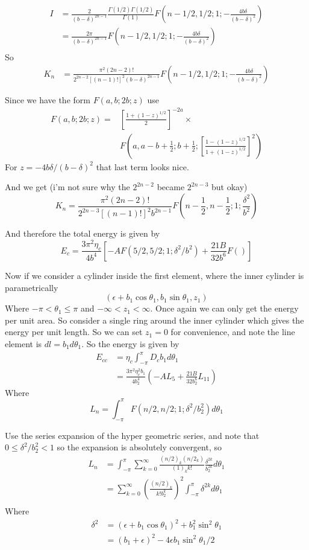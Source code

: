 \documentclass{E:/Documents/Latex/myassignment}
\begin{document}
\begin{align*}
	I &= \frac{2}{(b- \delta)^{2n-1}} \frac{\Gamma(1/2) \Gamma(1/2)}{\Gamma(1)} F(n-1/2,1/2;1;-\frac{4b \delta}{(b- \delta)^2})\\
	&= \frac{2\pi}{(b- \delta)^{2n-1}} F(n-1/2,1/2;1;-\frac{4b \delta}{(b- \delta)^2})\\
\end{align*}
So
\begin{align*}
	K_n &= \frac{\pi^2 (2n-2)!}{2^{2n-2} [(n-1)!]^2 (b- \delta)^{2n-1}} F(n-1/2,1/2;1; - \frac{4 b \delta}{(b - \delta)^2})
\end{align*}

Since we have the form $F(a,b;2b;z)$ use
\begin{align*}
	F(a,b;2b;z) = &\left[\frac{1 + (1-z)^{1/2}}2\right]^{-2a} \times \\
	&F\left(a,a-b+\frac12; b+\frac12; \left[\frac{1- (1-z)^{1/2}}{1+(1-z)^{1/2}}\right]^2 \right)	
\end{align*}
For $z = -4 b \delta/(b- \delta)^2$ that last term looks nice.


And we get (i'm not sure why the $2^{2n-2}$ became $2^{2n-3}$ but okay)
\[K_n = \frac{\pi^2(2n-2)!}{2^{2n-3}[(n-1)!]^{2} b^{2n-1}} F(n-\frac12, n - \frac12 ; 1 ; \frac{\delta^2}{b^2})\]

And therefore the total energy is given by
\[E_c = \frac{3\pi^2 \eta_c}{4b^4} \left[-AF(5/2,5/2;1;\delta^2/b^2) + \frac{21B}{32 b^6} F()\right]\]

Now if we consider a cylinder inside the first element, where the inner cylinder is parametrically
\[(\epsilon + b_1\cos\theta_1, b_1\sin\theta_1, z_1)\]
Where $-\pi < \theta_1 \leq \pi$ and $-\infty < z_1 < \infty$.
Once again we can only get the energy per unit area. So consider a single ring around the inner cylinder which gives the energy per unit length. So we can set $z_1 =0$ for convenience, and note the line element is $d l = b_1 d\theta_1$. So the energy is given by
\begin{align*}
	E_{cc} &= \eta_c \int_{-\pi}^{\pi} D_c b_1 d\theta_1\\
	&= \frac{3\pi^2\eta_c^2b_1}{4b_2^4} \left(-AL_5 + \frac{21B}{32b_2^6} L_{11}\right)
\end{align*}
Where
\[L_n = \int_{-\pi}^{\pi} F\left(n/2,n/2;1; \delta^2/b_2^2\right) d\theta_1\]

Use the series expansion of the hyper geometric series, and note that $0\leq \delta^2/b_2^2 < 1$ so the expansion is absolutely convergent, so
\begin{align*}
	L_n &= \int_{-\pi}^{\pi} \sum_{k=0}^\infty \frac{(n/2)_k (n/2_k)}{(1)_k k!} \frac{\delta^{2k}}{b_2^{2k}} d\theta_1\\
	&=\sum_{k=0}^\infty \left(\frac{(n/2)_k}{k! b_2^{k}}\right)^2 \int_{-\pi}^{\pi}\delta^{2k} d\theta_1\\
\end{align*}
Where
\begin{align*}
	\delta^2 &= (\epsilon + b_1 \cos\theta_1)^2 + b_1^2 \sin^2\theta_1\\
	&=(b_1 + \epsilon)^2 - 4 \epsilon b_1 \sin^2 \theta_1/2
\end{align*}
\end{document}

